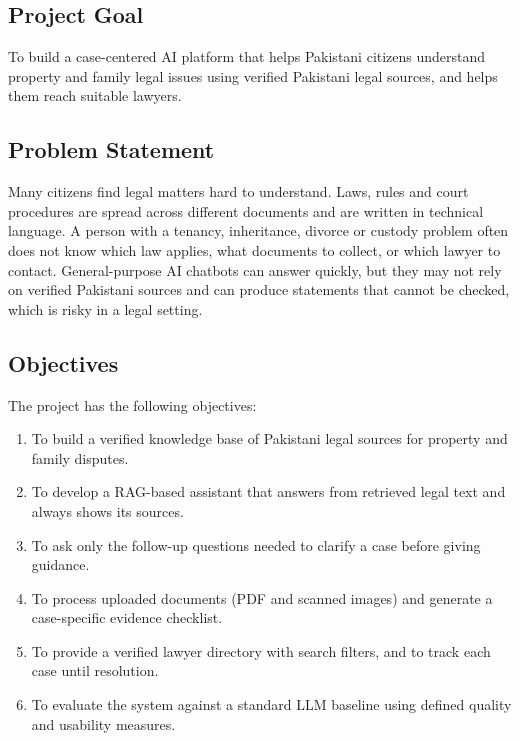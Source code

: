\documentclass[12pt,a4paper]{report}
\begin{document}
\subsection{Project Goal}
To build a case-centered AI platform that helps Pakistani citizens understand property and family legal issues using verified Pakistani legal sources, and helps them reach suitable lawyers.

\subsection{Problem Statement}
Many citizens find legal matters hard to understand. Laws, rules and court procedures are spread across different documents and are written in technical language. A person with a tenancy, inheritance, divorce or custody problem often does not know which law applies, what documents to collect, or which lawyer to contact. General-purpose AI chatbots can answer quickly, but they may not rely on verified Pakistani sources and can produce statements that cannot be checked, which is risky in a legal setting.

\subsection{Objectives}
The project has the following objectives:
\begin{enumerate}
  \item To build a verified knowledge base of Pakistani legal sources for property and family disputes.
  \item To develop a RAG-based assistant that answers from retrieved legal text and always shows its sources.
  \item To ask only the follow-up questions needed to clarify a case before giving guidance.
  \item To process uploaded documents (PDF and scanned images) and generate a case-specific evidence checklist.
  \item To provide a verified lawyer directory with search filters, and to track each case until resolution.
  \item To evaluate the system against a standard LLM baseline using defined quality and usability measures.
\end{enumerate}
\end{document}
